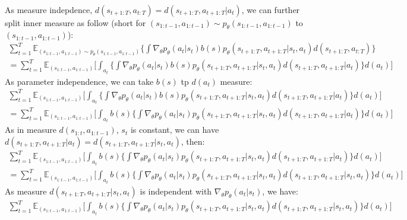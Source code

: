 \documentclass[12pt]{article}
\begin{document}
\begin{enumerate} [label=(\alph*)]
\begin{enumerate}[label=(\alph*)]
\begin{multline}
\end{multline}
 As measure indepdence, $d(s_{t+1:T}, a_{t:T}) = d(s_{t+1:T}, a_{t+1:T} | a_t)$, we can further split inner measure as follow (short for $(s_{1:t-1},a_{1:t-1}) \sim p_\theta(s_{1:t-1},a_{1:t-1})$ to $(s_{1:t-1},a_{1:t-1}) $):
  \begin{multline}
 \sum_{t=1}^T \mathbb{E}_{(s_{1:t-1},a_{1:t-1}) \sim p_\theta(s_{1:t-1},a_{1:t-1})} \lbrace \int \nabla_\theta p_\theta(a_t|s_t) b(s) p_\theta(s_{t+1:T}, a_{t+1:T} | s_t, a_t ) d(s_{t+1:T}, a_{t:T})\rbrace \\
 = \sum_{t=1}^T \mathbb{E}_{(s_{1:t-1},a_{1:t-1}) } \lbrack \int_{a_t} \lbrace \int \nabla_\theta p_\theta(a_t|s_t) b(s) p_\theta(s_{t+1:T}, a_{t+1:T} | s_t, a_t ) d(s_{t+1:T}, a_{t+1:T} | a_t)\rbrace d(a_t)\rbrack
 \end{multline}
As parameter independence, we can take $b(s)$ tp $d(a_t)$ measure:
 \begin{multline}
 \sum_{t=1}^T \mathbb{E}_{(s_{1:t-1},a_{1:t-1}) } \lbrack \int_{a_t} \lbrace \int \nabla_\theta p_\theta(a_t|s_t) b(s) p_\theta(s_{t+1:T}, a_{t+1:T} | s_t, a_t ) d(s_{t+1:T}, a_{t+1:T} | a_t)\rbrace d(a_t)\rbrack \\
= \sum_{t=1}^T \mathbb{E}_{(s_{1:t-1},a_{1:t-1}) } \lbrack \int_{a_t}  b(s) \lbrace \int \nabla_\theta p_\theta(a_t|s_t)  p_\theta(s_{t+1:T}, a_{t+1:T} | s_t, a_t ) d(s_{t+1:T}, a_{t+1:T} | a_t)\rbrace d(a_t)\rbrack
\end{multline}
As in measure $d(s_{1:t}, a_{1:t-1})$, $s_t$ is constant, we can have $d(s_{t+1:T}, a_{t+1:T} | a_t) = d(s_{t+1:T}, a_{t+1:T} | s_t, a_t) $, then:
 \begin{multline}
\sum_{t=1}^T \mathbb{E}_{(s_{1:t-1},a_{1:t-1}) } \lbrack \int_{a_t}  b(s) \lbrace \int \nabla_\theta p_\theta(a_t|s_t)  p_\theta(s_{t+1:T}, a_{t+1:T} | s_t, a_t ) d(s_{t+1:T}, a_{t+1:T} | a_t)\rbrace d(a_t)\rbrack \\
= \sum_{t=1}^T \mathbb{E}_{(s_{1:t-1},a_{1:t-1}) } \lbrack \int_{a_t}  b(s) \lbrace \int \nabla_\theta p_\theta(a_t|s_t)  p_\theta(s_{t+1:T}, a_{t+1:T} | s_t, a_t ) d(s_{t+1:T}, a_{t+1:T} | s_t, a_t)\rbrace d(a_t)\rbrack
\end{multline}
As measure $d(s_{t+1:T}, a_{t+1:T} | s_t, a_t) $ is independent with $\nabla_\theta p_\theta(a_t|s_t)$, we have:
 \begin{multline}
\sum_{t=1}^T \mathbb{E}_{(s_{1:t-1},a_{1:t-1}) } \lbrack \int_{a_t}  b(s) \lbrace \int \nabla_\theta p_\theta(a_t|s_t)  p_\theta(s_{t+1:T}, a_{t+1:T} | s_t, a_t ) d(s_{t+1:T}, a_{t+1:T} | s_t, a_t)\rbrace d(a_t)\rbrack \\

\end{multline}
\end{enumerate}
\end{enumerate}
\end{document}

